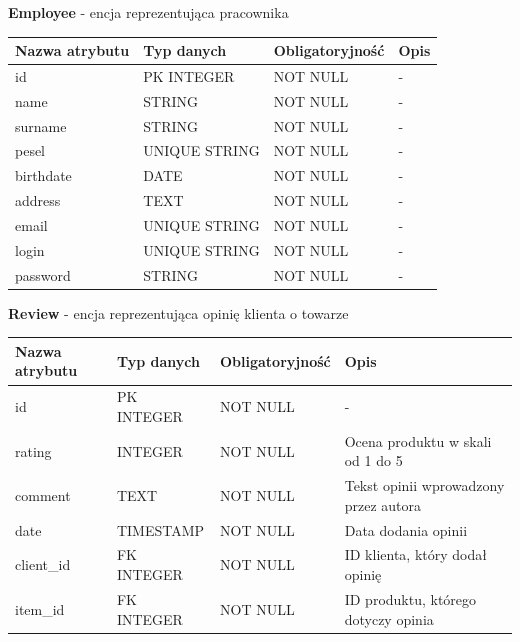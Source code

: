 \documentclass[10pt,a4paper]{article}
\begin{document}
	  \flushleft \textbf{Employee} - encja reprezentująca pracownika
	  \begin{center}
        \begin{tabular}{| m{3cm} | m{3cm} | m{3cm} | m{3cm} |}
          \hline
          Nazwa atrybutu & Typ danych 	 & Obligatoryjność & Opis\\ \hline
		  id  			 & PK INTEGER 	 & NOT NULL 	   & -\\ \hline
		  name 			 & STRING 	  	 & NOT NULL 	   & -\\ \hline
		  surname 		 & STRING 	  	 & NOT NULL 	   & -\\ \hline
		  pesel 		 & UNIQUE STRING & NOT NULL 	   & -\\ \hline
		  birthdate 	 & DATE 		 & NOT NULL 	   & -\\ \hline
		  address 	  	 & TEXT 		 & NOT NULL 	   & -\\ \hline
		  email 		 & UNIQUE STRING & NOT NULL 	   & -\\ \hline
		  login 		 & UNIQUE STRING & NOT NULL 	   & -\\ \hline
		  password 		 & STRING 		 & NOT NULL 	   & -\\ \hline
		\end{tabular}
	  \end{center}
	  
	  \flushleft \textbf{Review} - encja reprezentująca opinię klienta o towarze
	  \begin{center}
        \begin{tabular}{| m{3cm} | m{3cm} | m{3cm} | m{3cm} |}
          \hline
          Nazwa atrybutu & Typ danych & Obligatoryjność & Opis\\ \hline
		  id 			 & PK INTEGER & NOT NULL 	    & -\\ \hline
		  rating 		 & INTEGER 	  & NOT NULL 		& Ocena produktu w skali od 1 do 5\\ \hline
		  comment 		 & TEXT 	  & NOT NULL 		& Tekst opinii wprowadzony przez autora\\ \hline
		  date 			 & TIMESTAMP  & NOT NULL 		& Data dodania opinii\\ \hline
		  client\_id 	 & FK INTEGER & NOT NULL 		& ID klienta, który dodał opinię\\ \hline
		  item\_id 		 & FK INTEGER & NOT NULL 		& ID produktu, którego dotyczy opinia\\ \hline
		\end{tabular}
	  \end{center}
	
\end{document}
